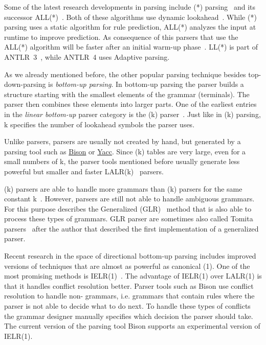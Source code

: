 Some of the latest research developments in  parsing include (*) parsing~\cite{parr2011ll} and its successor \gls{ALL(*)}~\cite{parr2014adaptive}. Both of these algorithms use dynamic lookahead~\cite[p. 1]{parr2011ll}. While (*) parsing uses a static algorithm for rule prediction, ALL(*) analyzes the input at runtime to improve prediction. As consequence of this parsers that use the \gls{ALL(*)} algorithm will be faster after an initial warm-up phase~\cite[p. 3]{parr2014adaptive}. LL(*) is part of \gls{ANTLR}~3~\cite[p. 3]{parr2014adaptive}, while \gls{ANTLR}~4 uses Adaptive  parsing.

As we already mentioned before, the other popular parsing technique besides top-down-parsing is \emph{bottom-up parsing}. In bottom-up parsing the parser builds a structure starting with the smallest elements of the grammar (terminals). The parser then combines these elements into larger parts. One of the earliest entries in the \emph{linear bottom-up} parser category is the (k) parser~\cite{knuth1965translation}. Just like in (k) parsing, k specifies the number of lookahead symbols the parser uses.

\begin{sloppypar}
Unlike  parsers,  parsers are usually not created by hand, but generated by a parsing tool such as \href{https://www.gnu.org/software/bison}{Bison} or \href{http://dinosaur.compilertools.net/yacc}{Yacc}. Since (k) tables are very large, even for a small numbers of k, the parser tools mentioned before usually generate less powerful but smaller and faster LALR(k)~\cite{deremer1969practical} parsers.
\end{sloppypar}

(k) parsers are able to handle more grammars than (k) parsers for the same constant k~\cite[section “Lookahead”]{haberman2013ll}. However,  parsers are still not able to handle ambiguous grammars. For this purpose \citeauthor{lang1974deterministic} describes the Generalized  (GLR)~\cite{lang1974deterministic} method that is also able to process these types of grammars. GLR parser are sometimes also called Tomita parsers~\cite{tomita1985efficient} after the author that described the first implementation of a generalized  parser.

Recent research in the space of directional bottom-up parsing includes improved versions of techniques that are almost as powerful as canonical (1). One of the most promising methods is IELR(1)~\cite{denny2008ielr}. The advantage of IELR(1) over LALR(1) is that it handles conflict resolution better. Parser tools such as Bison use conflict resolution to handle non- grammars, i.e. grammars that contain rules where the parser is not able to decide what to do next. To handle these types of conflicts the grammar designer manually specifies which decision the parser should take. The current version of the parsing tool Bison supports an experimental version of IELR(1).

